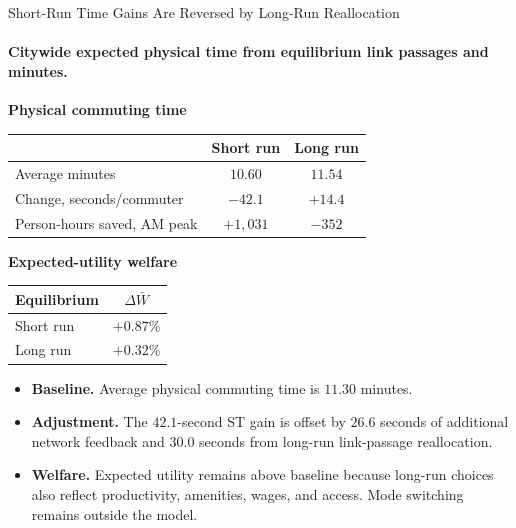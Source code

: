\documentclass[11pt,aspectratio=169]{beamer}
\newcommand{\good}[1]{\textcolor{blue!70!black}{#1}}
\newcommand{\bad}[1]{\textcolor{red!70!black}{#1}}
\begin{document}
\begin{frame}[label=result2]{Short-Run Time Gains Are Reversed by Long-Run Reallocation}
\framesubtitle{Citywide expected physical time from equilibrium link passages and minutes.}
\centering
\begin{minipage}[t]{0.62\textwidth}
\centering
\small\textbf{Physical commuting time}\par
\vspace{0.35em}
\scriptsize
\renewcommand{\arraystretch}{1.18}
\setlength{\tabcolsep}{6pt}
\begin{tabular}{lcc}
\toprule
 & Short run & Long run \\
\midrule
Average minutes & $10.60$ & $11.54$ \\
Change, seconds/commuter & \good{$-42.1$} & \bad{$+14.4$} \\
Person-hours saved, AM peak & \good{$+1{,}031$} & \bad{$-352$} \\
\bottomrule
\end{tabular}
\end{minipage}\hfill
\begin{minipage}[t]{0.30\textwidth}
\centering
\small\textbf{Expected-utility welfare}\par
\vspace{0.35em}
\scriptsize
\begin{tabular}{lc}
\toprule
Equilibrium & $\Delta\bar W$ \\
\midrule
Short run & \good{$+0.87\%$} \\
Long run & \good{$+0.32\%$} \\
\bottomrule
\end{tabular}
\end{minipage}

\vspace{0.60em}
\begin{itemize}\footnotesize\setlength\itemsep{0.35em}
  \item \textbf{Baseline.} Average physical commuting time is $11.30$ minutes.
  \item \textbf{Adjustment.} The $42.1$-second ST gain is offset by $26.6$ seconds of additional network feedback and $30.0$ seconds from long-run link-passage reallocation.
  \item \textbf{Welfare.} Expected utility remains above baseline because long-run choices also reflect productivity, amenities, wages, and access. Mode switching remains outside the model.
\end{itemize}
\end{frame}
\end{document}
